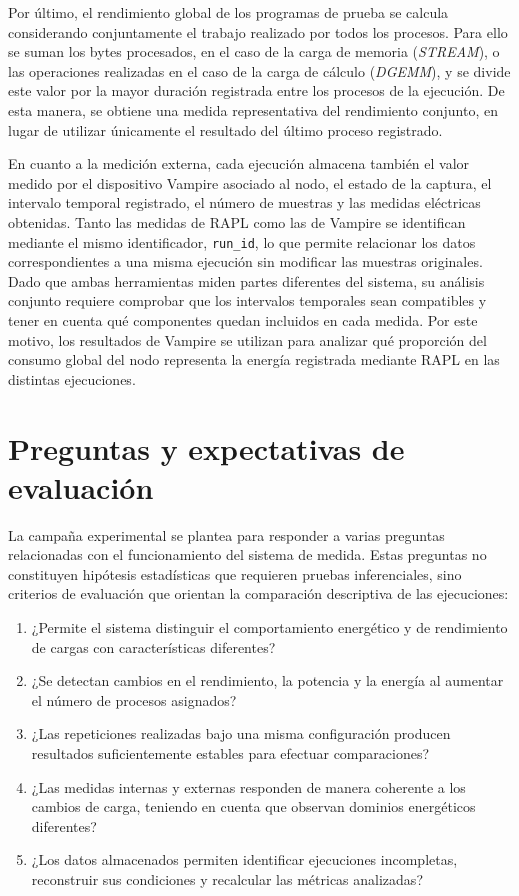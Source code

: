 Por último, el rendimiento global de los programas de prueba se calcula considerando conjuntamente el trabajo realizado por todos los procesos. Para ello se suman los bytes procesados, en el caso de la carga de memoria (\emph{STREAM}), o las operaciones realizadas en el caso de la carga de cálculo (\emph{DGEMM}), y se divide este valor por la mayor duración registrada entre los procesos de la ejecución. De esta manera, se obtiene una medida representativa del rendimiento conjunto, en lugar de utilizar únicamente el resultado del último proceso registrado. 

En cuanto a la medición externa, cada ejecución almacena también el valor medido por el dispositivo Vampire asociado al nodo, el estado de la captura, el intervalo temporal registrado, el número de muestras y las medidas eléctricas obtenidas. Tanto las medidas de RAPL como las de Vampire se identifican mediante el mismo identificador, \texttt{run\_id}, lo que permite relacionar los datos correspondientes a una misma ejecución sin modificar las muestras originales. Dado que ambas herramientas miden partes diferentes del sistema, su análisis conjunto requiere comprobar que los intervalos temporales sean compatibles y tener en cuenta qué componentes quedan incluidos en cada medida. Por este motivo, los resultados de Vampire se utilizan para analizar qué proporción del consumo global del nodo representa la energía registrada mediante RAPL en las distintas ejecuciones.

\section{Preguntas y expectativas de evaluación}
\label{sec:preguntas-evaluacion}

La campaña experimental se plantea para responder a varias preguntas relacionadas con el funcionamiento del sistema de medida. Estas preguntas no constituyen hipótesis estadísticas que requieren pruebas inferenciales, sino criterios de evaluación que orientan la comparación descriptiva de las ejecuciones:

\begin{enumerate}
    \item ¿Permite el sistema distinguir el comportamiento energético y de rendimiento de cargas con características diferentes?
    \item ¿Se detectan cambios en el rendimiento, la potencia y la energía al aumentar el número de procesos asignados?
    \item ¿Las repeticiones realizadas bajo una misma configuración producen resultados suficientemente estables para efectuar comparaciones?
    \item ¿Las medidas internas y externas responden de manera coherente a los cambios de carga, teniendo en cuenta que observan dominios energéticos diferentes?
    \item ¿Los datos almacenados permiten identificar ejecuciones incompletas, reconstruir sus condiciones y recalcular las métricas analizadas?
\end{enumerate}

